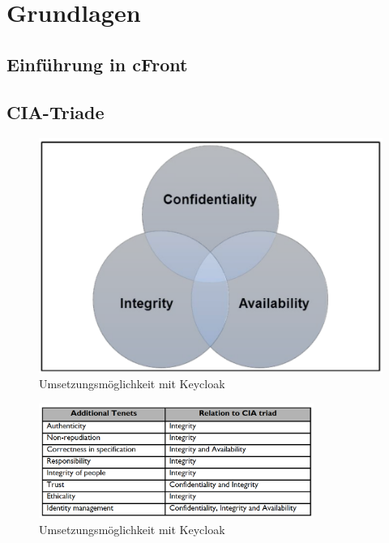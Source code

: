 \chapter{Grundlagen}

\section{Einführung in cFront}

\section{CIA-Triade}

\begin{figure}[h]
	\centering 
	\includegraphics[width=0.5
    \textwidth]{img/abbildungen/CIA-Triad.png}
	\captionsetup{format=hang}
	\caption{Umsetzungsmöglichkeit mit Keycloak}
\end{figure}

\begin{figure}[h]
	\centering 
	\includegraphics[width=0.8\textwidth]{img/abbildungen/Schutzziele.png}
	\captionsetup{format=hang}
	\caption{Umsetzungsmöglichkeit mit Keycloak}
\end{figure}

